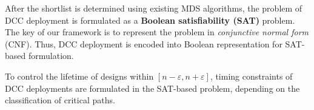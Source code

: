 \begin{comment}
\begin{figure}
    	\centering
        	\texttt{[image: upper.png]}
       	\caption{A DCC deployment leads path $p$ to fail prematurely}
    	\label{fig:sec:prefail}
\end{figure}
\end{comment}
After the shortlist is determined using existing MDS algorithms, the problem of DCC deployment is formulated as a \textbf{Boolean satisfiability (SAT)} problem. %
The key of our framework is to represent the problem in \textit{conjunctive normal form} (CNF). %
Thus, DCC deployment is encoded into Boolean representation for SAT-based formulation. %
\begin{comment}
{\small
\begin{tabular}{ c c c }
   & DCC type & $\left\{B_{p,2},B_{p,1}\right\}$ \\
  (1)\quad & None & \{0,0\} \\
  (2)\quad & 20\% &  \{0,1\} \\
  (3)\quad & 40\% &  \{1,0\} \\
  (4)\quad & 80\% &  \{1,1\} \\
\end{tabular}}
\end{comment}
To control the lifetime of designs within $[n - \varepsilon, n + \varepsilon]$, timing constraints of DCC deployments are formulated in the SAT-based problem, depending on the classification of critical paths.
